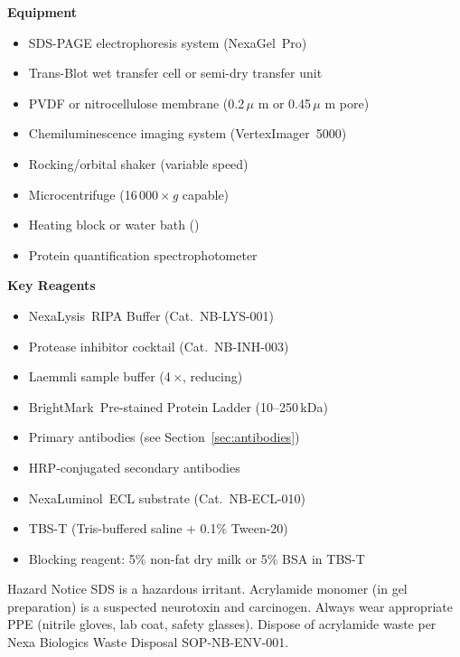 \begin{minipage}[t]{0.48\textwidth}
\vspace{0pt}
\textbf{\color{NexaBlue}Equipment}
\begin{itemize}
  \item SDS-PAGE electrophoresis system (NexaGel\texttrademark~Pro)
  \item Trans-Blot wet transfer cell or semi-dry transfer unit
  \item PVDF or nitrocellulose membrane (0.2\,\ensuremath{\mu} m or 0.45\,\ensuremath{\mu} m pore)
  \item Chemiluminescence imaging system (VertexImager\texttrademark~5000)
  \item Rocking/orbital shaker (variable speed)
  \item Microcentrifuge (16\,000\,$\times$\,\textit{g} capable)
  \item Heating block or water bath ()
  \item Protein quantification spectrophotometer
\end{itemize}
\end{minipage}%
\hfill%
\begin{minipage}[t]{0.48\textwidth}
\vspace{0pt}
\textbf{\color{NexaBlue}Key Reagents}
\begin{itemize}
  \item NexaLysis\texttrademark~RIPA Buffer (Cat.\ NB-LYS-001)
  \item Protease inhibitor cocktail (Cat.\ NB-INH-003)
  \item Laemmli sample buffer (4\,$\times$, reducing)
  \item BrightMark\texttrademark~Pre-stained Protein Ladder (10--250\,kDa)
  \item Primary antibodies (see Section~\ref{sec:antibodies})
  \item HRP-conjugated secondary antibodies
  \item NexaLuminol\texttrademark~ECL substrate (Cat.\ NB-ECL-010)
  \item TBS-T (Tris-buffered saline + 0.1\% Tween-20)
  \item Blocking reagent: 5\% non-fat dry milk or 5\% BSA in TBS-T
\end{itemize}
\end{minipage}

\par\vspace{6pt}
\begin{warnbox}{Hazard Notice}
SDS is a hazardous irritant. Acrylamide monomer (in gel preparation) is a
suspected neurotoxin and carcinogen. Always wear appropriate PPE (nitrile gloves,
lab coat, safety glasses). Dispose of acrylamide waste per Nexa Biologics
Waste Disposal SOP-NB-ENV-001.
\end{warnbox}
